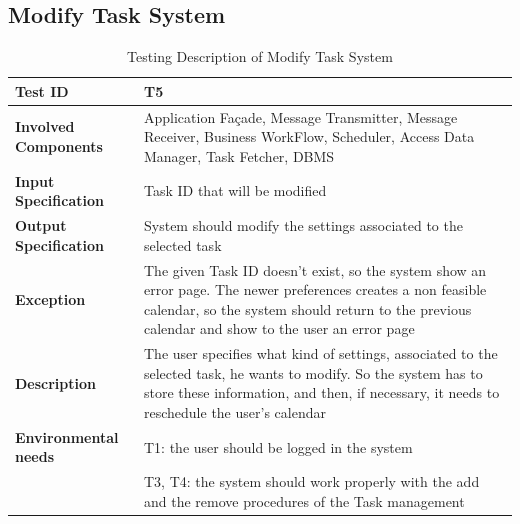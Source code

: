 \subsection*{Modify Task System}

\begin{table}[H]
    \centering
    \begin{tabular}{p{4.55cm} p{7cm}}
        
        \hline
        
        \textbf{Test ID}                & T5 \\
        
        \hline
        
        \textbf{Involved Components}    & Application Façade, Message Transmitter, Message Receiver, Business                                          WorkFlow, Scheduler, Access Data Manager, Task Fetcher, DBMS\\
        
        \hline
        
        \textbf{Input Specification}    & Task ID that will be modified\\
        
        \hline
        
        \textbf{Output Specification}   & System should modify the settings associated to the selected task\\
        
        \hline
        
        \textbf{Exception}              & The given Task ID doesn't exist, so the system show an error page. The newer preferences creates a non feasible calendar, so the system should return to the previous calendar and show to the user an error page\\
        
        \hline
        
        \textbf{Description}            & The user specifies what kind of settings, associated to the selected task, he wants to modify. So the system has to store these information, and then, if necessary, it needs to reschedule the user's calendar\\
        \hline
        
        \textbf{Environmental needs}    & T1: the user should be logged in the system\\
                                        & T3, T4: the system should work properly with the add and the remove procedures of the Task management \\
        
        \hline
        
    \end{tabular}
    \caption{Testing Description of Modify Task System}
    
\end{table}




